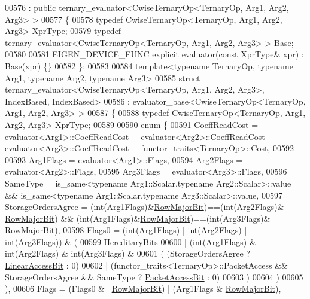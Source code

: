 \begin{DoxyCode}
00576   : \textcolor{keyword}{public} ternary\_evaluator<CwiseTernaryOp<TernaryOp, Arg1, Arg2, Arg3> >
00577 \{
00578   \textcolor{keyword}{typedef} CwiseTernaryOp<TernaryOp, Arg1, Arg2, Arg3> XprType;
00579   \textcolor{keyword}{typedef} ternary\_evaluator<CwiseTernaryOp<TernaryOp, Arg1, Arg2, Arg3> > Base;
00580   
00581   EIGEN\_DEVICE\_FUNC \textcolor{keyword}{explicit} evaluator(\textcolor{keyword}{const} XprType& xpr) : Base(xpr) \{\}
00582 \};
00583 
00584 \textcolor{keyword}{template}<\textcolor{keyword}{typename} TernaryOp, \textcolor{keyword}{typename} Arg1, \textcolor{keyword}{typename} Arg2, \textcolor{keyword}{typename} Arg3>
00585 \textcolor{keyword}{struct }ternary\_evaluator<CwiseTernaryOp<TernaryOp, Arg1, Arg2, Arg3>, IndexBased, IndexBased>
00586   : evaluator\_base<CwiseTernaryOp<TernaryOp, Arg1, Arg2, Arg3> >
00587 \{
00588   \textcolor{keyword}{typedef} CwiseTernaryOp<TernaryOp, Arg1, Arg2, Arg3> XprType;
00589   
00590   \textcolor{keyword}{enum} \{
00591     CoeffReadCost = evaluator<Arg1>::CoeffReadCost + evaluator<Arg2>::CoeffReadCost + 
      evaluator<Arg3>::CoeffReadCost + functor\_traits<TernaryOp>::Cost,
00592     
00593     Arg1Flags = evaluator<Arg1>::Flags,
00594     Arg2Flags = evaluator<Arg2>::Flags,
00595     Arg3Flags = evaluator<Arg3>::Flags,
00596     SameType = is\_same<typename Arg1::Scalar,typename Arg2::Scalar>::value && is\_same<typename
       Arg1::Scalar,typename Arg3::Scalar>::value,
00597     StorageOrdersAgree = (int(Arg1Flags)&\hyperlink{group__flags_gae4f56c2a60bbe4bd2e44c5b19cbe8762}{RowMajorBit})==(\textcolor{keywordtype}{int}(Arg2Flags)&
      \hyperlink{group__flags_gae4f56c2a60bbe4bd2e44c5b19cbe8762}{RowMajorBit}) && (\textcolor{keywordtype}{int}(Arg1Flags)&\hyperlink{group__flags_gae4f56c2a60bbe4bd2e44c5b19cbe8762}{RowMajorBit})==(\textcolor{keywordtype}{int}(Arg3Flags)&
      \hyperlink{group__flags_gae4f56c2a60bbe4bd2e44c5b19cbe8762}{RowMajorBit}),
00598     Flags0 = (\textcolor{keywordtype}{int}(Arg1Flags) | int(Arg2Flags) | int(Arg3Flags)) & (
00599         HereditaryBits
00600         | (\textcolor{keywordtype}{int}(Arg1Flags) & \textcolor{keywordtype}{int}(Arg2Flags) & \textcolor{keywordtype}{int}(Arg3Flags) &
00601            ( (StorageOrdersAgree ? \hyperlink{group__flags_ga4b983a15d57cd55806df618ac544d09e}{LinearAccessBit} : 0)
00602            | (functor\_traits<TernaryOp>::PacketAccess && StorageOrdersAgree && SameType ? 
      \hyperlink{group__flags_ga1a306a438e1ab074e8be59512e887b9f}{PacketAccessBit} : 0)
00603            )
00604         )
00605      ),
00606     Flags = (Flags0 & ~\hyperlink{group__flags_gae4f56c2a60bbe4bd2e44c5b19cbe8762}{RowMajorBit}) | (Arg1Flags & \hyperlink{group__flags_gae4f56c2a60bbe4bd2e44c5b19cbe8762}{RowMajorBit}),

\end{DoxyCode}
